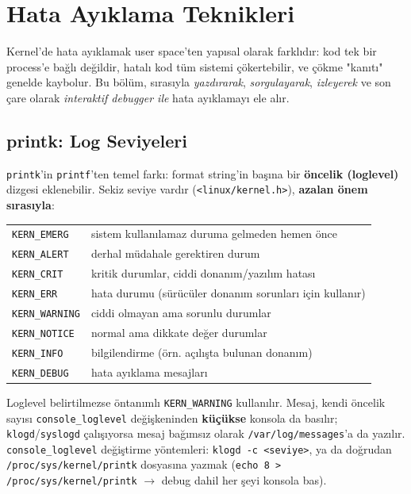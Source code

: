 \documentclass[11pt,a4paper]{article}
\begin{document}
\newpage

\section{Hata Ay\i klama Teknikleri}
\label{sec:bolum4}

Kernel'de hata ayıklamak user space'ten yapısal olarak farklıdır: kod
tek bir process'e bağlı değildir, hatalı kod tüm sistemi çökertebilir,
ve çökme "kanıtı" genelde kaybolur. Bu bölüm, sırasıyla \emph{yazdırarak},
\emph{sorgulayarak}, \emph{izleyerek} ve son çare olarak
\emph{interaktif debugger ile} hata ayıklamayı ele alır.

\subsection{printk: Log Seviyeleri}

\texttt{printk}'in \texttt{printf}'ten temel farkı: format string'in
başına bir \textbf{öncelik (loglevel)} dizgesi eklenebilir. Sekiz
seviye vardır (\texttt{<linux/kernel.h>}), \textbf{azalan önem
sırasıyla}:

\begin{center}
\begin{tabular}{ll}
\texttt{KERN\_EMERG} & sistem kullanılamaz duruma gelmeden hemen önce \\
\texttt{KERN\_ALERT} & derhal müdahale gerektiren durum \\
\texttt{KERN\_CRIT} & kritik durumlar, ciddi donanım/yazılım hatası \\
\texttt{KERN\_ERR} & hata durumu (sürücüler donanım sorunları için kullanır) \\
\texttt{KERN\_WARNING} & ciddi olmayan ama sorunlu durumlar \\
\texttt{KERN\_NOTICE} & normal ama dikkate değer durumlar \\
\texttt{KERN\_INFO} & bilgilendirme (örn. açılışta bulunan donanım) \\
\texttt{KERN\_DEBUG} & hata ayıklama mesajları \\
\end{tabular}
\end{center}

Loglevel belirtilmezse öntanımlı \texttt{KERN\_WARNING} kullanılır.
Mesaj, kendi öncelik sayısı \texttt{console\_loglevel} değişkeninden
\textbf{küçükse} konsola da basılır; \texttt{klogd}/\texttt{syslogd}
çalışıyorsa mesaj bağımsız olarak \texttt{/var/log/messages}'a da
yazılır. \texttt{console\_loglevel} değiştirme yöntemleri:
\texttt{klogd -c <seviye>}, ya da doğrudan
\texttt{/proc/sys/kernel/printk} dosyasına yazmak (\texttt{echo 8 >
/proc/sys/kernel/printk} $\to$ debug dahil her şeyi konsola bas).
\end{document}
